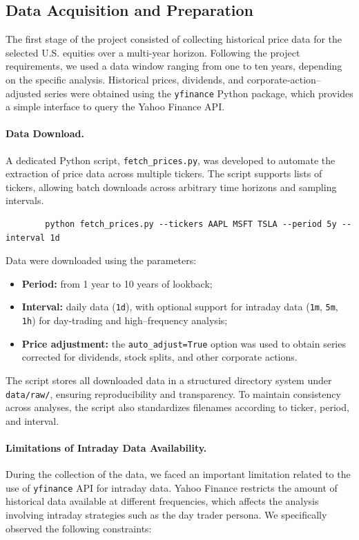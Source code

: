 \documentclass[12pt, a4paper]{article}
\begin{document}
	\subsection{Data Acquisition and Preparation}
	
	The first stage of the project consisted of collecting historical price data for the selected U.S. equities over a multi-year horizon.  
	Following the project requirements, we used a data window ranging from one to ten years, depending on the specific analysis.  
	Historical prices, dividends, and corporate‐action–adjusted series were obtained using the \texttt{yfinance} Python package, which provides a simple interface to query the Yahoo Finance API.
	
	\paragraph{Data Download.}
	A dedicated Python script, \texttt{fetch\_prices.py}, was developed to automate the extraction of price data across multiple tickers.  
	The script supports lists of tickers, allowing batch downloads across arbitrary time horizons and sampling intervals.
	\begin{verbatim}
		python fetch_prices.py --tickers AAPL MSFT TSLA --period 5y --interval 1d
	\end{verbatim}
	\vspace{-6mm}
	Data were downloaded using the parameters:
	\begin{itemize}
		\item \textbf{Period:} from 1 year to 10 years of lookback;
		\item \textbf{Interval:} daily data (\texttt{1d}), with optional support for intraday data (\texttt{1m}, \texttt{5m}, \texttt{1h}) for day-trading and high–frequency analysis;
		\item \textbf{Price adjustment:} the \texttt{auto\_adjust=True} option was used to obtain series corrected for dividends, stock splits, and other corporate actions.
	\end{itemize}
	
	The script stores all downloaded data in a structured directory system under \texttt{data/raw/}, ensuring reproducibility and transparency.  
	To maintain consistency across analyses, the script also standardizes filenames according to ticker, period, and interval.
	
	
	\paragraph{Limitations of Intraday Data Availability.}
	During the collection of the data, we faced an important limitation related to the use of \texttt{yfinance} API for intraday data. Yahoo Finance restricts the amount of historical data available at different frequencies, which affects the analysis involving intraday strategies such as the day trader persona. We specifically observed the following constraints:
	
\end{document}
